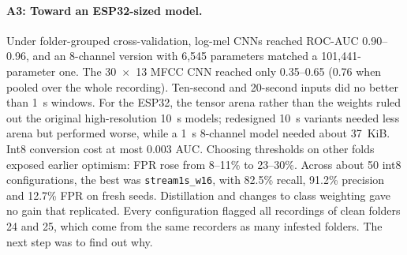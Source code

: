 \paragraph{A3: Toward an ESP32-sized model.} Under folder-grouped cross-validation, log-mel CNNs reached ROC-AUC 0.90--0.96, and an 8-channel version with 6,545 parameters matched a 101,441-parameter one. The 30~$\times$~13 MFCC CNN reached only 0.35--0.65 (0.76 when pooled over the whole recording). Ten-second and 20-second inputs did no better than 1~s windows. For the ESP32, the tensor arena rather than the weights ruled out the original high-resolution 10~s models; redesigned 10~s variants needed less arena but performed worse, while a 1~s 8-channel model needed about 37~KiB. Int8 conversion cost at most 0.003 AUC. Choosing thresholds on other folds exposed earlier optimism: FPR rose from 8--11\% to 23--30\%. Across about 50 int8 configurations, the best was \texttt{stream1s\_w16}, with 82.5\% recall, 91.2\% precision and 12.7\% FPR on fresh seeds. Distillation and changes to class weighting gave no gain that replicated. Every configuration flagged all recordings of clean folders 24 and 25, which come from the same recorders as many infested folders. The next step was to find out why.


